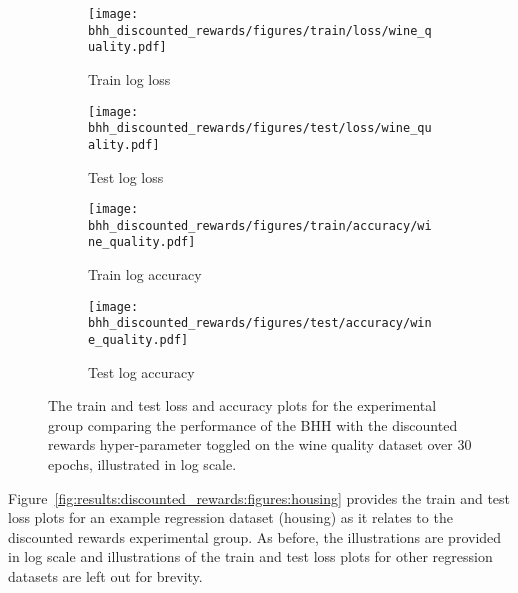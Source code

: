 \begin{figure}[htbp]
      \begin{subfigure}{0.5\textwidth}
            \centering
            \texttt{[image: bhh\_discounted\_rewards/figures/train/loss/wine\_quality.pdf]}
            \caption{Train log loss}
            \label{fig:results:discounted_rewards:figures:loss:train:wine_quality}
      \end{subfigure}
      \begin{subfigure}{0.5\textwidth}
            \centering
            \texttt{[image: bhh\_discounted\_rewards/figures/test/loss/wine\_quality.pdf]}
            \caption{Test log loss}
            \label{fig:results:discounted_rewards:figures:loss:test:wine_quality}
      \end{subfigure}
      \par\bigskip
      \begin{subfigure}{0.5\textwidth}
            \centering
            \texttt{[image: bhh\_discounted\_rewards/figures/train/accuracy/wine\_quality.pdf]}
            \caption{Train log accuracy}
            \label{fig:results:discounted_rewards:figures:accuracy:train:wine_quality}
      \end{subfigure}
      \begin{subfigure}{0.5\textwidth}
            \centering
            \texttt{[image: bhh\_discounted\_rewards/figures/test/accuracy/wine\_quality.pdf]}
            \caption{Test log accuracy}
            \label{fig:results:discounted_rewards:figures:accuracy:test:wine_quality}
      \end{subfigure}
      \par\bigskip
      \caption{The train and test loss and accuracy plots for the experimental group comparing the performance of the \acs{BHH} with the discounted rewards hyper-parameter toggled on the wine quality dataset over 30 epochs, illustrated in log scale.}
      \label{fig:results:discounted_rewards:figures:wine_quality}
\end{figure}

Figure~\ref{fig:results:discounted_rewards:figures:housing} provides the train and test loss plots for an example regression dataset (housing) as it relates to the discounted rewards experimental group. As before, the illustrations are provided in log scale and illustrations of the train and test loss plots for other regression datasets are left out for brevity.

